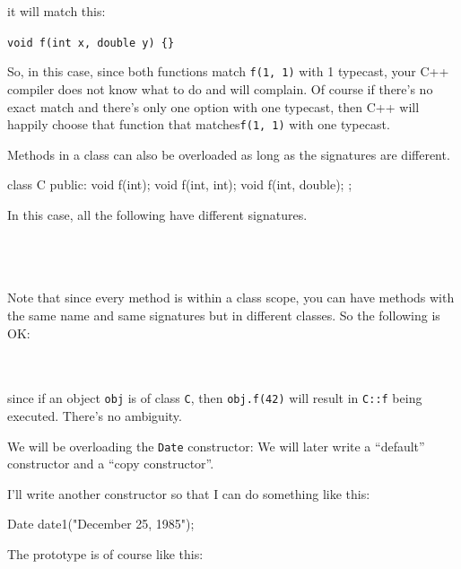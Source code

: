 it will match this:

\verb!void f(int x, double y) {}!

So, in this case, since both functions match \texttt{f(1, 1)} with 1
typecast, your C++ compiler does not know what to do and will complain.
Of course if there's no exact match and
there's only one option with one typecast, then C++ will
happily choose that function that matches\texttt{f(1, 1)} with one typecast.


\newpage{}

Methods in a class can also be overloaded as long as the signatures are
different.

\begin{consolethree}[escapeinside=||]
class C
{
public:
    void f(int);
    void f(int, int);
    void f(int, double);
};
\end{consolethree}

In this case, all the following have different signatures.

\\

\\

\\

Note that since every method is within a class scope, you can have
methods with the same name and same signatures but in different classes.
So the following is OK:

\\

\\

since if an object \texttt{obj} is of class \texttt{C}, then
\texttt{obj.f(42)} will result in \texttt{C::f} being executed. There's no
ambiguity.

We will be overloading the \texttt{Date} constructor: We will later write
a ``default'' constructor and a ``copy constructor''.

I'll write another constructor so that I can do something like this:

\begin{consolethree}[escapeinside=||]
Date date1("December 25, 1985");
\end{consolethree}

The prototype is of course like this:

